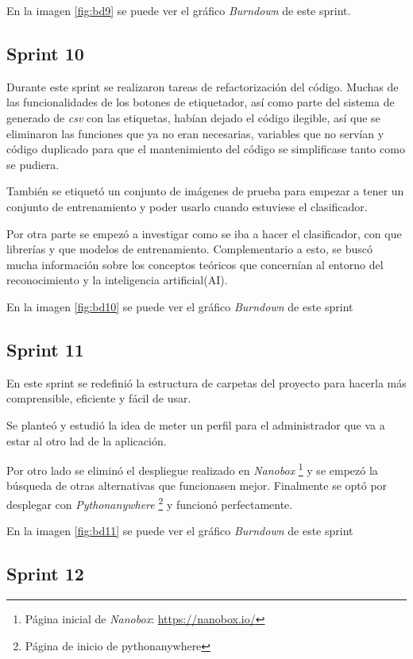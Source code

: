 En la imagen \ref{fig:bd9} se puede ver el gráfico \textit{Burndown} de este sprint.

\subsection{Sprint 10}

Durante este sprint se realizaron tareas de refactorización del código. Muchas de las funcionalidades de los botones de etiquetador, así como parte del sistema de generado de \textit{csv} con las etiquetas, habían dejado el código ilegible, así que se eliminaron las funciones que ya no eran necesarias, variables que no servían y código duplicado para que el mantenimiento del código se simplificase tanto como se pudiera.

También se etiquetó un conjunto de imágenes de prueba para empezar a tener un conjunto de entrenamiento y poder usarlo cuando estuviese el clasificador.

Por otra parte se empezó a investigar como se iba a hacer el clasificador, con que librerías y que modelos de entrenamiento. Complementario a esto, se buscó mucha información sobre los conceptos teóricos que concernían al entorno del reconocimiento y la inteligencia artificial(AI).

En la imagen \ref{fig:bd10} se puede ver el gráfico \textit{Burndown} de este sprint
\subsection{Sprint 11}

En este sprint se redefinió la estructura de carpetas del proyecto para hacerla más comprensible, eficiente y fácil de usar.

Se planteó y estudió la idea de meter un perfil para el administrador que va a estar al otro lad de la aplicación.

Por otro lado se eliminó el despliegue realizado en \textit{Nanobox} \footnote{Página inicial de \textit{Nanobox}: \url{https://nanobox.io/} } y se empezó la búsqueda de otras alternativas que funcionasen mejor.
Finalmente se optó por desplegar con \textit{Pythonanywhere} \footnote{Página de inicio de pythonanywhere} y funcionó perfectamente.

En la imagen \ref{fig:bd11} se puede ver el gráfico \textit{Burndown} de este sprint
\subsection{Sprint 12}

